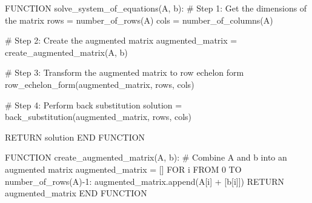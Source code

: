 \documentclass[
  letterpaper,
  DIV=11,
  numbers=noendperiod]{scrreprt}
\newenvironment{Shaded}{\begin{snugshade}}{\end{snugshade}}
\newcommand{\CommentTok}[1]{\textcolor[rgb]{0.37,0.37,0.37}{#1}}
\newcommand{\DecValTok}[1]{\textcolor[rgb]{0.68,0.00,0.00}{#1}}
\newcommand{\NormalTok}[1]{\textcolor[rgb]{0.00,0.23,0.31}{#1}}
\newcommand{\OperatorTok}[1]{\textcolor[rgb]{0.37,0.37,0.37}{#1}}
\theoremstyle{plain}
\theoremstyle{definition}
\theoremstyle{remark}
\begin{document}
\begin{Shaded}
\begin{Highlighting}[]
\NormalTok{FUNCTION solve\_system\_of\_equations(A, b):}
    \CommentTok{\# Step 1: Get the dimensions of the matrix}
\NormalTok{    rows }\OperatorTok{=}\NormalTok{ number\_of\_rows(A)}
\NormalTok{    cols }\OperatorTok{=}\NormalTok{ number\_of\_columns(A)}
    
    \CommentTok{\# Step 2: Create the augmented matrix}
\NormalTok{    augmented\_matrix }\OperatorTok{=}\NormalTok{ create\_augmented\_matrix(A, b)}
    
    \CommentTok{\# Step 3: Transform the augmented matrix to row echelon form}
\NormalTok{    row\_echelon\_form(augmented\_matrix, rows, cols)}
    
    \CommentTok{\# Step 4: Perform back substitution}
\NormalTok{    solution }\OperatorTok{=}\NormalTok{ back\_substitution(augmented\_matrix, rows, cols)}
    
\NormalTok{    RETURN solution}
\NormalTok{END FUNCTION}

\NormalTok{FUNCTION create\_augmented\_matrix(A, b):}
    \CommentTok{\# Combine A and b into an augmented matrix}
\NormalTok{    augmented\_matrix }\OperatorTok{=}\NormalTok{ []}
\NormalTok{    FOR i FROM }\DecValTok{0}\NormalTok{ TO number\_of\_rows(A)}\OperatorTok{{-}}\DecValTok{1}\NormalTok{:}
\NormalTok{        augmented\_matrix.append(A[i] }\OperatorTok{+}\NormalTok{ [b[i]])}
\NormalTok{    RETURN augmented\_matrix}
\NormalTok{END FUNCTION}


\end{Highlighting}
\end{Shaded}
\end{document}

